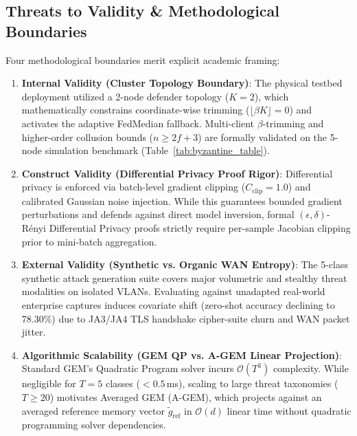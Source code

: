 \documentclass[journal,10pt,twocolumn]{IEEEtran}
\begin{document}
\subsection{Threats to Validity \& Methodological Boundaries}
Four methodological boundaries merit explicit academic framing:
\begin{enumerate}
    \item \textbf{Internal Validity (Cluster Topology Boundary)}: The physical testbed deployment utilized a 2-node defender topology ($K=2$), which mathematically constrains coordinate-wise trimming ($\lfloor \beta K \rfloor = 0$) and activates the adaptive FedMedian fallback. Multi-client $\beta$-trimming and higher-order collusion bounds ($n \ge 2f + 3$) are formally validated on the 5-node simulation benchmark (Table~\ref{tab:byzantine_table}).
    \item \textbf{Construct Validity (Differential Privacy Proof Rigor)}: Differential privacy is enforced via batch-level gradient clipping ($C_{\text{clip}}=1.0$) and calibrated Gaussian noise injection. While this guarantees bounded gradient perturbations and defends against direct model inversion, formal $(\epsilon, \delta)$-Rényi Differential Privacy proofs strictly require per-sample Jacobian clipping prior to mini-batch aggregation.
    \item \textbf{External Validity (Synthetic vs. Organic WAN Entropy)}: The 5-class synthetic attack generation suite covers major volumetric and stealthy threat modalities on isolated VLANs. Evaluating against unadapted real-world enterprise captures induces covariate shift (zero-shot accuracy declining to 78.30\%) due to JA3/JA4 TLS handshake cipher-suite churn and WAN packet jitter.
    \item \textbf{Algorithmic Scalability (GEM QP vs. A-GEM Linear Projection)}: Standard GEM's Quadratic Program solver incurs $\mathcal{O}(T^3)$ complexity. While negligible for $T=5$ classes ($<0.5$\,ms), scaling to large threat taxonomies ($T \ge 20$) motivates Averaged GEM (A-GEM), which projects against an averaged reference memory vector $\tilde{g}_{\text{ref}}$ in $\mathcal{O}(d)$ linear time without quadratic programming solver dependencies.
\end{enumerate}
\end{document}
